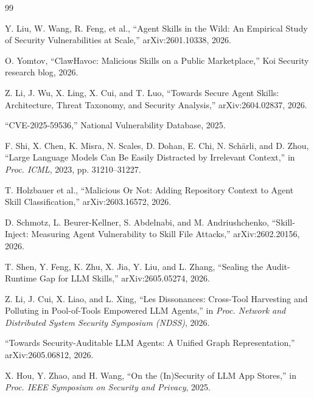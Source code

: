 \documentclass[conference]{IEEEtran}
\begin{document}
\begin{thebibliography}{99}

Y. Liu, W. Wang, R. Feng, et al., ``Agent Skills in the Wild: An Empirical Study
of Security Vulnerabilities at Scale,'' arXiv:2601.10338, 2026.

O. Yomtov, ``ClawHavoc: Malicious Skills on a Public Marketplace,'' Koi Security
research blog, 2026.

Z. Li, J. Wu, X. Ling, X. Cui, and T. Luo, ``Towards Secure Agent Skills:
Architecture, Threat Taxonomy, and Security Analysis,'' arXiv:2604.02837, 2026.

``CVE-2025-59536,'' National Vulnerability Database, 2025.

F. Shi, X. Chen, K. Misra, N. Scales, D. Dohan, E. Chi, N. Sch\"arli, and
D. Zhou, ``Large Language Models Can Be Easily Distracted by Irrelevant
Context,'' in \emph{Proc. ICML}, 2023, pp. 31210--31227.

T. Holzbauer et al., ``Malicious Or Not: Adding Repository Context to Agent
Skill Classification,'' arXiv:2603.16572, 2026.

D. Schmotz, L. Beurer-Kellner, S. Abdelnabi, and M. Andriushchenko,
``Skill-Inject: Measuring Agent Vulnerability to Skill File Attacks,''
arXiv:2602.20156, 2026.

T. Shen, Y. Feng, K. Zhu, X. Jia, Y. Liu, and L. Zhang, ``Sealing the
Audit-Runtime Gap for LLM Skills,'' arXiv:2605.05274, 2026.

Z. Li, J. Cui, X. Liao, and L. Xing, ``Les Dissonances: Cross-Tool Harvesting
and Polluting in Pool-of-Tools Empowered LLM Agents,'' in \emph{Proc. Network
and Distributed System Security Symposium (NDSS)}, 2026.

``Towards Security-Auditable LLM Agents: A Unified Graph Representation,''
arXiv:2605.06812, 2026.

X. Hou, Y. Zhao, and H. Wang, ``On the (In)Security of LLM App Stores,'' in
\emph{Proc. IEEE Symposium on Security and Privacy}, 2025.


\end{thebibliography}
\end{document}
